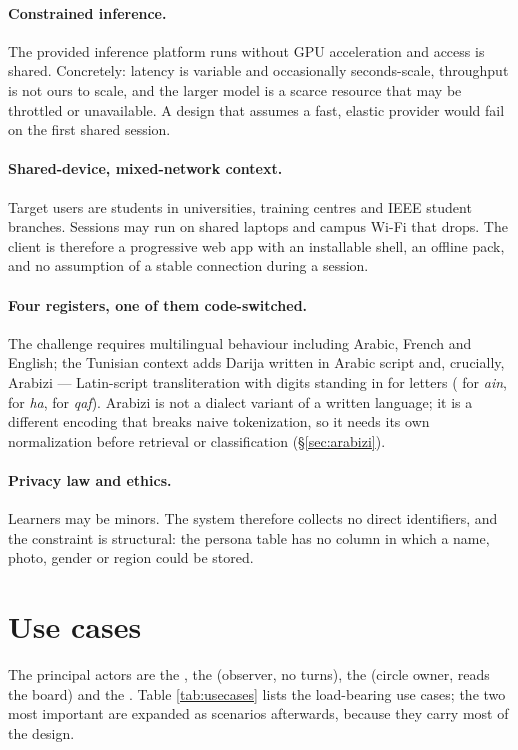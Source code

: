 \paragraph{Constrained inference.} The provided inference platform runs without GPU
acceleration and access is shared. Concretely: latency is variable and occasionally
seconds-scale, throughput is not ours to scale, and the larger model is a scarce
resource that may be throttled or unavailable. A design that assumes a fast, elastic
provider would fail on the first shared session.

\paragraph{Shared-device, mixed-network context.} Target users are students in
universities, training centres and IEEE student branches. Sessions may run on shared
laptops and campus Wi-Fi that drops. The client is therefore a progressive web app with
an installable shell, an offline pack, and no assumption of a stable connection during a
session.

\paragraph{Four registers, one of them code-switched.} The challenge requires
multilingual behaviour including Arabic, French and English; the Tunisian context adds
Darija written in Arabic script and, crucially, Arabizi --- Latin-script transliteration
with digits standing in for letters ( for \emph{ain},  for \emph{ha},
 for \emph{qaf}). Arabizi is not a dialect variant of a written language; it is a
different encoding that breaks naive tokenization, so it needs its own normalization
before retrieval or classification (\S\ref{sec:arabizi}).

\paragraph{Privacy law and ethics.} Learners may be minors. The system therefore collects
no direct identifiers, and the constraint is structural: the persona table has no column
in which a name, photo, gender or region could be stored.

\section{Use cases}

The principal actors are the , the  (observer, no turns), the
 (circle owner, reads the board) and the . Table
\ref{tab:usecases} lists the load-bearing use cases; the two most important are expanded
as scenarios afterwards, because they carry most of the design.

